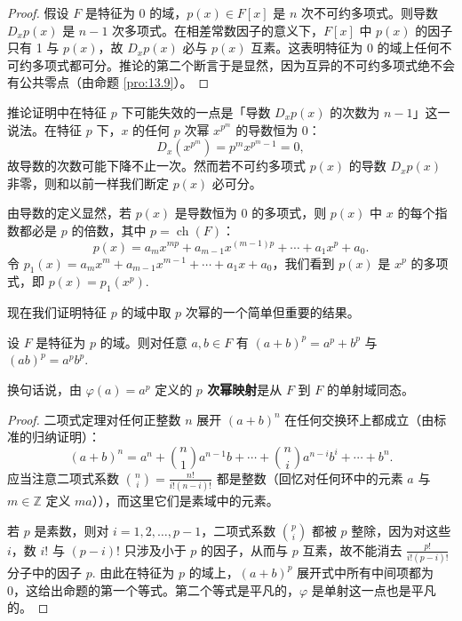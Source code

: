 \begin{proof}
假设 \(F\) 是特征为 0 的域，\(p(x) \in F[x]\) 是 \(n\) 次不可约多项式。则导数 \(D_xp(x)\) 是 \(n-1\) 次多项式。在相差常数因子的意义下，\(F[x]\) 中 \(p(x)\) 的因子只有 1 与 \(p(x)\)，故 \(D_xp(x)\) 必与 \(p(x)\) 互素。这表明特征为 0 的域上任何不可约多项式都可分。推论的第二个断言于是显然，因为互异的不可约多项式绝不会有公共零点（由命题 \ref{pro:13.9}）。
\end{proof}

推论证明中在特征 \(p\) 下可能失效的一点是「导数 \(D_xp(x)\) 的次数为 \(n-1\)」这一说法。在特征 \(p\) 下，\(x\) 的任何 \(p\) 次幂 \(x^{p^m}\) 的导数恒为 0：
\[
D_x(x^{p^m}) = p^mx^{p^m-1} = 0,
\]
故导数的次数可能下降不止一次。然而若不可约多项式 \(p(x)\) 的导数 \(D_xp(x)\) 非零，则和以前一样我们断定 \(p(x)\) 必可分。

由导数的定义显然，若 \(p(x)\) 是导数恒为 0 的多项式，则 \(p(x)\) 中 \(x\) 的每个指数都必是 \(p\) 的倍数，其中 \(p = \operatorname{ch}(F)\)：
\[
p(x) = a_mx^{mp}+a_{m-1}x^{(m-1)p}+\cdots+a_1x^p+a_0.
\]
令 \(p_1(x) = a_mx^m+a_{m-1}x^{m-1}+\cdots+a_1x+a_0\)，我们看到 \(p(x)\) 是 \(x^p\) 的多项式，即 \(p(x) = p_1(x^p)\).

现在我们证明特征 \(p\) 的域中取 \(p\) 次幂的一个简单但重要的结果。

\begin{proposition}\label{pro:13.35}
设 \(F\) 是特征为 \(p\) 的域。则对任意 \(a, b \in F\) 有 \((a+b)^p = a^p+b^p\) 与 \((ab)^p = a^pb^p\).

换句话说，由 \(\varphi(a) = a^p\) 定义的 \textbf{\(p\) 次幂映射}是从 \(F\) 到 \(F\) 的单射域同态。
\end{proposition}

\begin{proof}
二项式定理对任何正整数 \(n\) 展开 \((a+b)^n\) 在任何交换环上都成立（由标准的归纳证明）：
\[
(a+b)^n = a^n+\binom{n}{1}a^{n-1}b+\cdots+\binom{n}{i}a^{n-i}b^i+\cdots+b^n.
\]
应当注意二项式系数 \(\binom{n}{i} = \frac{n!}{i!(n-i)!}\) 都是整数（回忆对任何环中的元素 \(a\) 与 \(m \in \mathbb{Z}\) 定义 \(ma\)）），而这里它们是素域中的元素。

若 \(p\) 是素数，则对 \(i = 1, 2, \ldots, p-1\)，二项式系数 \(\binom{p}{i}\) 都被 \(p\) 整除，因为对这些 \(i\)，数 \(i!\) 与 \((p-i)!\) 只涉及小于 \(p\) 的因子，从而与 \(p\) 互素，故不能消去 \(\frac{p!}{i!(p-i)!}\) 分子中的因子 \(p\). 由此在特征为 \(p\) 的域上，\((a+b)^p\) 展开式中所有中间项都为 0，这给出命题的第一个等式。第二个等式是平凡的，\(\varphi\) 是单射这一点也是平凡的。
\end{proof}

